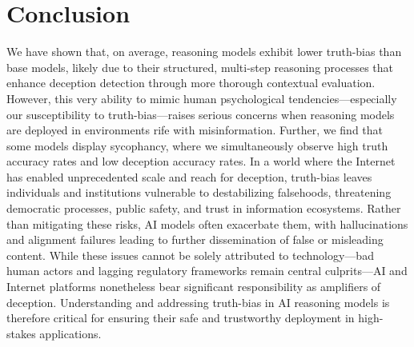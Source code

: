 \documentclass{article}
\begin{document}
\section{Conclusion}
\label{sec:conclusion}

We have shown that, on average, reasoning models exhibit lower truth-bias than base models, likely due to their structured, multi-step reasoning processes that enhance deception detection through more thorough contextual evaluation. However, this very ability to mimic human psychological tendencies---especially our susceptibility to truth-bias---raises serious concerns when reasoning models are deployed in environments rife with misinformation. Further, we find that some models display sycophancy, where we simultaneously observe high truth accuracy rates and low deception accuracy rates. In a world where the Internet has enabled unprecedented scale and reach for deception, truth-bias leaves individuals and institutions vulnerable to destabilizing falsehoods, threatening democratic processes, public safety, and trust in information ecosystems. Rather than mitigating these risks, AI models often exacerbate them, with hallucinations and alignment failures leading to further dissemination of false or misleading content. While these issues cannot be solely attributed to technology---bad human actors and lagging regulatory frameworks remain central culprits---AI and Internet platforms nonetheless bear significant responsibility as amplifiers of deception. Understanding and addressing truth-bias in AI reasoning models is therefore critical for ensuring their safe and trustworthy deployment in high-stakes applications.







\newpage
\appendix
\end{document}
